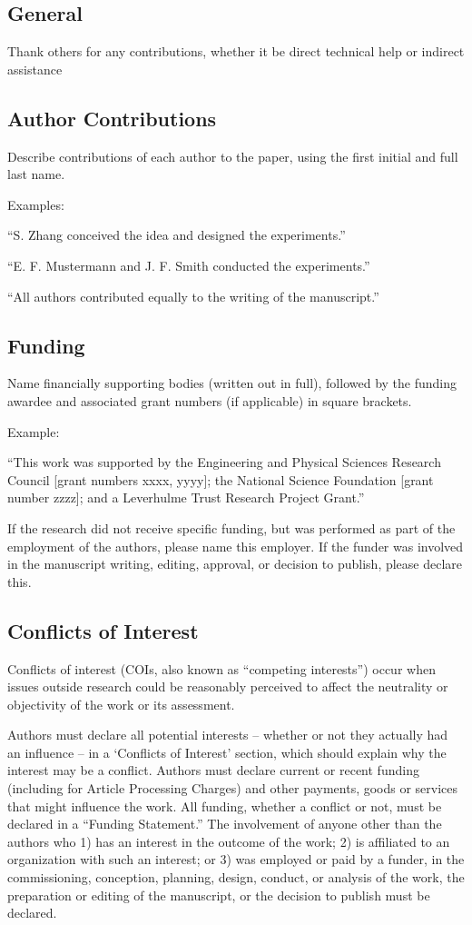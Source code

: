 \documentclass{article}
\begin{document}
\subsection*{General} 
Thank others for any contributions, whether it be direct technical help or indirect assistance 

\subsection*{Author Contributions} 
Describe contributions of each author to the paper, using the first initial and full last name. 

\medskip Examples:

``S. Zhang conceived the idea and designed the experiments.''

``E. F. Mustermann and J. F. Smith conducted the experiments.''

``All authors contributed equally to the writing of the manuscript.''

\subsection*{Funding}
Name financially supporting bodies (written out in full), followed by the funding awardee and associated grant numbers (if applicable) in square brackets. 

\medskip Example: 

``This work was supported by the Engineering and Physical Sciences Research Council [grant numbers xxxx, yyyy]; the National Science Foundation [grant number zzzz]; and a Leverhulme Trust Research Project Grant.'' 

\medskip
If the research did not receive specific funding, but was performed as part of the employment of the authors, please name this employer. If the funder was involved in the manuscript writing, editing, approval, or decision to publish, please declare this.

\subsection*{Conflicts of Interest}
Conflicts of interest (COIs, also known as ``competing interests'') occur when issues outside research could be reasonably perceived to affect the neutrality or objectivity of the work or its assessment. 

Authors must declare all potential interests – whether or not they actually had an influence – in a ‘Conflicts of Interest’ section, which should explain why the interest may be a conflict. Authors must declare current or recent funding (including for Article Processing Charges) and other payments, goods or services that might influence the work. All funding, whether a conflict or not, must be declared in a ``Funding Statement.'' The involvement of anyone other than the authors who 1) has an interest in the outcome of the work; 2) is affiliated to an organization with such an interest; or 3) was employed or paid by a funder, in the commissioning, conception, planning, design, conduct, or analysis of the work, the preparation or editing of the manuscript, or the decision to publish must be declared.
\end{document}
